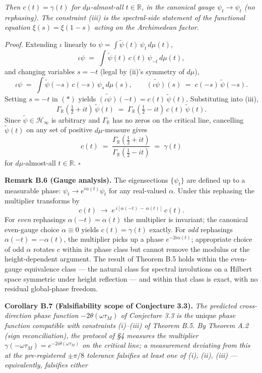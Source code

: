 \documentclass[
  letterpaper,
  11pt]{article}
\theoremstyle{plain}
\theoremstyle{definition}
\theoremstyle{remark}
\begin{document}
\emph{Then \(c(t) = \gamma(t)\) for \(d\mu\)-almost-all \(t \in \mathbb{R}\), in the canonical gauge \(\psi_t \to \psi_t\) (no rephasing). The constraint (iii) is the spectral-side statement of the functional equation \(\xi(s) = \xi(1-s)\) acting on the Archimedean factor.}

\emph{Proof.} Extending \(\iota\) linearly to \(\psi = \int \tilde\psi(t)\,\psi_t\,d\mu(t)\),
\[\iota\psi \;=\; \int \tilde\psi(t)\,c(t)\,\psi_{-t}\,d\mu(t),\]
and changing variables \(s = -t\) (legal by (ii)'s symmetry of \(d\mu\)),
\[\iota\psi \;=\; \int \tilde\psi(-s)\,c(-s)\,\psi_s\,d\mu(s), \qquad \widetilde{(\iota\psi)}(s) \;=\; c(-s)\,\tilde\psi(-s). \tag{$\ast$}\]
Setting \(s = -t\) in \((\ast)\) yields \(\widetilde{(\iota\psi)}(-t) = c(t)\,\tilde\psi(t)\). Substituting into (iii),
\[\Gamma_{\mathbb{R}}\!\left(\tfrac{1}{2}+it\right)\,\tilde\psi(t) \;=\; \Gamma_{\mathbb{R}}\!\left(\tfrac{1}{2}-it\right)\,c(t)\,\tilde\psi(t).\]
Since \(\tilde\psi \in \mathcal{H}_\infty\) is arbitrary and \(\Gamma_{\mathbb{R}}\) has no zeros on the critical line, cancelling \(\tilde\psi(t)\) on any set of positive \(d\mu\)-measure gives
\[c(t) \;=\; \frac{\Gamma_{\mathbb{R}}\!\left(\tfrac{1}{2}+it\right)}{\Gamma_{\mathbb{R}}\!\left(\tfrac{1}{2}-it\right)} \;=\; \gamma(t)\]
for \(d\mu\)-almost-all \(t \in \mathbb{R}\). \(\square\)

\textbf{Remark B.6 (Gauge analysis).} The eigensections \(\{\psi_t\}\) are defined up to a measurable phase: \(\psi_t \to e^{i\alpha(t)}\psi_t\) for any real-valued \(\alpha\). Under this rephasing the multiplier transforms by
\[c(t) \;\to\; e^{\,i[\alpha(-t)\,-\,\alpha(t)]}\,c(t).\]
For \emph{even} rephasings \(\alpha(-t) = \alpha(t)\) the multiplier is invariant; the canonical even-gauge choice \(\alpha \equiv 0\) yields \(c(t) = \gamma(t)\) exactly. For \emph{odd} rephasings \(\alpha(-t) = -\alpha(t)\), the multiplier picks up a phase \(e^{-2i\alpha(t)}\); appropriate choice of odd \(\alpha\) rotates \(c\) within its phase class but cannot remove the modulus or the height-dependent argument. The result of Theorem B.5 holds within the even-gauge equivalence class --- the natural class for spectral involutions on a Hilbert space symmetric under height reflection --- and within that class is exact, with no residual global-phase freedom.

\textbf{Corollary B.7 (Falsifiability scope of Conjecture 3.3).} \emph{The predicted cross-direction phase function \(-2\theta(\omega\tau_M)\) of Conjecture 3.3 is the} unique \emph{phase function compatible with constraints (i)--(iii) of Theorem B.5. By Theorem A.2 (sign reconciliation), the protocol of §4 measures the multiplier \(\gamma(-\omega\tau_M) = e^{-2i\theta(\omega\tau_M)}\) on the critical line; a measurement deviating from this at the pre-registered \(\pm\pi/8\) tolerance falsifies at least one of (i), (ii), (iii) --- equivalently, falsifies either}
\end{document}
